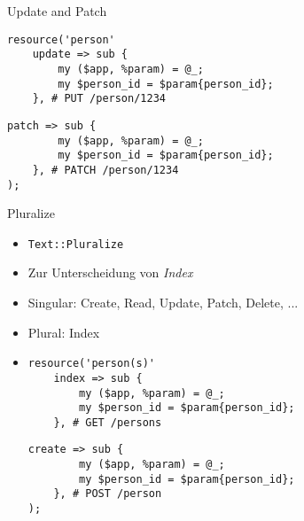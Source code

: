 \documentclass[aspectratio=1610]{beamer}
\begin{document}

\begin{frame}[fragile]{Update and Patch}

\begin{lstlisting}
resource('person'
    update => sub {
        my ($app, %param) = @_;
        my $person_id = $param{person_id};
    }, # PUT /person/1234
\end{lstlisting}\pause\begin{lstlisting}[firstnumber=last]
    patch => sub {
        my ($app, %param) = @_;
        my $person_id = $param{person_id};
    }, # PATCH /person/1234
);
\end{lstlisting}
\end{frame}


\begin{frame}[fragile]{Pluralize}

\begin{itemize}
    \item \texttt{Text::Pluralize}
    \pause
    \item Zur Unterscheidung von \textit{Index}
    \pause
    \item Singular: Create, Read, Update, Patch, Delete, ...
    \pause
    \item Plural: Index
    \pause
    \item[]
\begin{lstlisting}
resource('person(s)'
    index => sub {
        my ($app, %param) = @_;
        my $person_id = $param{person_id};
    }, # GET /persons
\end{lstlisting}\pause\begin{lstlisting}[firstnumber=last]
    create => sub {
        my ($app, %param) = @_;
        my $person_id = $param{person_id};
    }, # POST /person
);
\end{lstlisting}
\end{itemize}
\end{frame}

\end{document}
